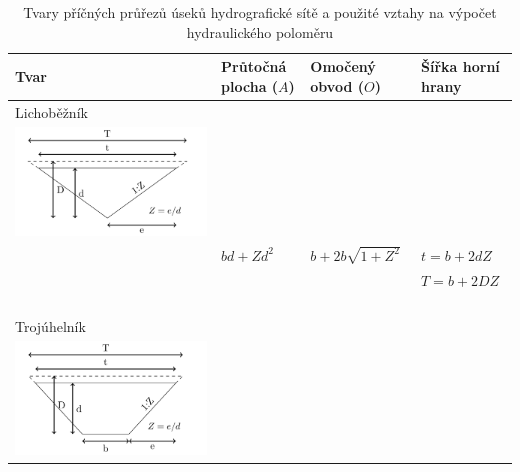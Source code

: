 \newcommand\xlicho{0}
\newcommand\ylicho{7}

\newcommand\xtroj{0}
\newcommand\ytroj{4}

\newcommand\xpara{0}
\newcommand\ypara{1}

\newcommand\vyska{1.8}    %
\newcommand\sirka{5}    %




\begin{table}[t]
\centering
  \caption{Tvary příčných průřezů úseků hydrografické sítě a použité vztahy na výpočet hydraulického poloměru}
  \label{fig:tvary_koryt}
\begin{tabular}{p{}p{}p{}p{}}
  Tvar  & Průtočná plocha ($A$) &  Omočený obvod ($O$) & Šířka horní hrany\\ \hline
   Lichoběžník &  &  \\
  \multirow{2}{*}{
    \includegraphics[width=\linewidth]{./img/trojuhelnik.png}
  } &  & & \\  
  &  &   & \\
  &  $bd + Zd^2$  & $b+2b\sqrt{1+Z^2}$  & $t = b+2dZ$ \\
  & &    & $T = b+2DZ$ \\
  &  &   & \\
  &  &  &  \\
  &  &   & \\
  &  &   & \\
  Trojúhelník &  &   & \\
 \multirow{2}{*}{
   \includegraphics[width=\linewidth]{./img/lichobeznik.png}
}
\end{tabular}
\end{table}
